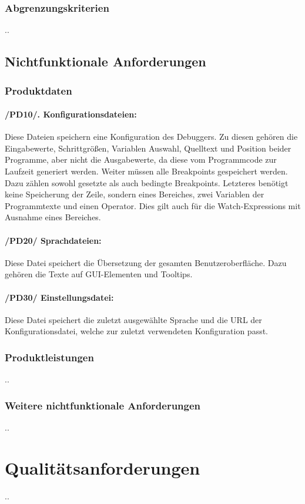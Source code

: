 \documentclass[parskip=full]{scrartcl}
\begin{document}
		\subsubsection{Abgrenzungskriterien}
		..
	\subsection{Nichtfunktionale Anforderungen}
		\subsubsection{Produktdaten}
			\paragraph{/PD10/. Konfigurationsdateien:}
			Diese Dateien speichern eine Konfiguration des Debuggers.
			Zu diesen gehören die Eingabewerte, Schrittgrößen, Variablen Auswahl, 						Quelltext und Position beider Programme, aber nicht die Ausgabewerte, da diese 			vom Programmcode zur Laufzeit generiert werden.
			Weiter müssen alle Breakpoints gespeichert werden. Dazu zählen sowohl gesetzte 			als auch bedingte Breakpoints. Letzteres benötigt keine Speicherung der Zeile, 			sondern eines Bereiches, zwei Variablen der Programmtexte und einen Operator. 				Dies gilt auch für die Watch-Expressions mit Ausnahme eines Bereiches.
			\paragraph{/PD20/ Sprachdateien:}
			Diese Datei speichert die Übersetzung der gesamten Benutzeroberfläche.
			Dazu gehören die Texte auf GUI-Elementen und Tooltips.
			\paragraph{/PD30/ Einstellungsdatei:}
			Diese Datei speichert die zuletzt ausgewählte Sprache und die URL der 						Konfigurationsdatei, welche zur zuletzt verwendeten Konfiguration passt.
		\subsubsection{Produktleistungen}
		..
		\subsubsection{Weitere nichtfunktionale Anforderungen}
		..

\section{Qualitätsanforderungen}
..
\end{document}
